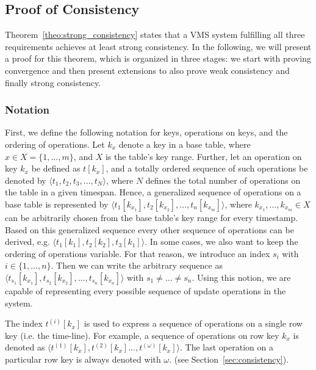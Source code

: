 \subsection{Proof of Consistency}


Theorem~\ref{theo:strong_consistency} states that a VMS system fulfilling all 
three requirements achieves at least strong consistency. In the following, we 
will present a proof for this theorem, which is organized in three stages: we 
start with proving convergence and then present extensions to also prove weak 
consistency  and finally strong consistency.





\subsubsection{Notation}
First, we define the following notation for keys, 
operations on keys, and the ordering of operations. Let $k_x$ denote a key in 
a base table, where $x \in X = \{1, \dots, m\}$, and $X$ is the 
table's key range. Further, let an operation on key $k_x$ be defined as 
$t[k_x]$, and a totally ordered sequence of such operations be denoted by 
$\langle t_1, t_2, t_{3}, \dots, t_N\rangle$, where $N$ defines the total 
number of operations on the table in a given timespan. 
Hence, a generalized sequence of operations on a base table is 
represented by $\langle t_1[k_{x_1}], t_2[k_{x_2}], \dots, 
t_n[k_{x_m}]\rangle$, where $k_{x_1}, \dots, k_{x_m} \in X$ can be arbitrarily 
chosen from the base table's key range for every timestamp. Based on this 
generalized sequence every other sequence of operations can be derived, e.g. 
$\langle t_1[k_{1}],t_2[k_{2}],t_3[k_{1}]\rangle$. In some cases, we also want 
to keep the ordering of operations variable. For that reason, we introduce an 
index $s_i$ with $i \in \{1, \dots, n\}$. Then we can write the arbitrary 
sequence as $\langle t_{s_1}[k_{x_1}], t_{s_2}[k_{x_2}], \dots, 
t_{s_n}[k_{x_n}]\rangle$ with $s_1\neq \dots \neq s_n$. Using this notion, we 
are capable of representing every possible sequence of update operations in 
the system. 

The index $t^{(i)}[k_x]$ is used to express a sequence of operations on 
a single row key (i.e. the time-line). For example, a sequence of 
operations on row key $k_x$ is denoted as $\langle 
t^{(1)}[k_x],t^{(2)}[k_x]...,t^{( \omega)}[k_x]\rangle$. The last 
operation on a particular row key is always denoted with $\omega$. (see 
Section~\ref{sec:consistency}).


